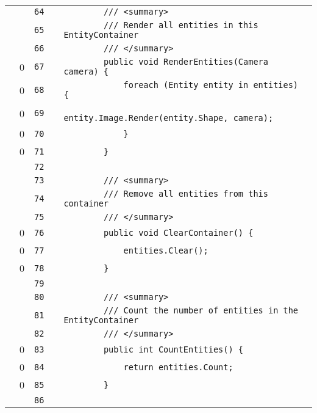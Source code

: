 \documentclass[a4paper,landscape,10pt]{article}
\begin{document}
\begin{longtable}[l]{lrrll}
\cellcolor{gray} &  & \verb~64~ & & \verb~        /// <summary>~\\
\cellcolor{gray} &  & \verb~65~ & & \verb~        /// Render all entities in this EntityContainer~\\
\cellcolor{gray} &  & \verb~66~ & & \verb~        /// </summary>~\\
\cellcolor{red} & 0 & \verb~67~ & & \verb~        public void RenderEntities(Camera camera) {~\\
\cellcolor{red} & 0 & \verb~68~ & & \verb~            foreach (Entity entity in entities) {~\\
\cellcolor{red} & 0 & \verb~69~ & & \verb~                entity.Image.Render(entity.Shape, camera);~\\
\cellcolor{red} & 0 & \verb~70~ & & \verb~            }~\\
\cellcolor{red} & 0 & \verb~71~ & & \verb~        }~\\
\cellcolor{gray} &  & \verb~72~ & & \verb~~\\
\cellcolor{gray} &  & \verb~73~ & & \verb~        /// <summary>~\\
\cellcolor{gray} &  & \verb~74~ & & \verb~        /// Remove all entities from this container~\\
\cellcolor{gray} &  & \verb~75~ & & \verb~        /// </summary>~\\
\cellcolor{red} & 0 & \verb~76~ & & \verb~        public void ClearContainer() {~\\
\cellcolor{red} & 0 & \verb~77~ & & \verb~            entities.Clear();~\\
\cellcolor{red} & 0 & \verb~78~ & & \verb~        }~\\
\cellcolor{gray} &  & \verb~79~ & & \verb~~\\
\cellcolor{gray} &  & \verb~80~ & & \verb~        /// <summary>~\\
\cellcolor{gray} &  & \verb~81~ & & \verb~        /// Count the number of entities in the EntityContainer~\\
\cellcolor{gray} &  & \verb~82~ & & \verb~        /// </summary>~\\
\cellcolor{red} & 0 & \verb~83~ & & \verb~        public int CountEntities() {~\\
\cellcolor{red} & 0 & \verb~84~ & & \verb~            return entities.Count;~\\
\cellcolor{red} & 0 & \verb~85~ & & \verb~        }~\\
\cellcolor{gray} &  & \verb~86~ & & \verb~~\\

\end{longtable}
\end{document}
